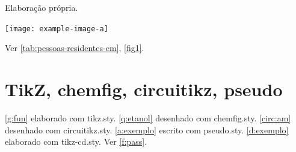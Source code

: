 \documentclass{abntexto}
\def\me{Elaboração própria.}
\begin{document}
\src\me
\label{fig1}
\begin{place}
    \texttt{[image: example-image-a]}
\end{place}

Ver \ref{tab:pessoas-residentes-em}, \ref{fig1}.

\section{TikZ, chemfig, circuitikz, pseudo}

\ref{g:fun} elaborado com {\ttfamily tikz.sty}. \ref{q:etanol} desenhado com {\ttfamily chemfig.sty}. \ref{circ:am} desenhado com {\ttfamily circuitikz.sty}. \ref{a:exemplo} escrito com {\ttfamily pseudo.sty}. \ref{d:exemplo} elaborado com {\ttfamily tikz-cd.sty}. Ver \ref{f:pass}.
\end{document}
